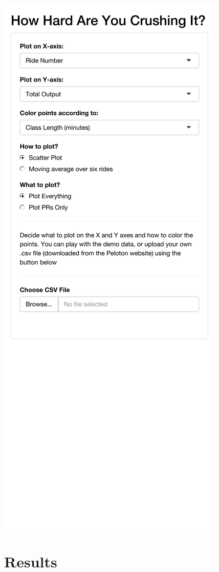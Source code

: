 \documentclass[
]{article}
\begin{document}
\href{https://arraycgh.shinyapps.io/crushing_it/}{\includegraphics{GamifyingRides_files/figure-latex/Shiny App-1.pdf}}

\newpage

\hypertarget{results}{%
\section{Results}\label{results}}
\end{document}

